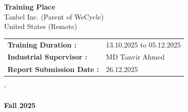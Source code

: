 \begin{titlepage}
\begin{center}
\vspace{0.8cm}

\textbf{Training Place}\\
Tanbel Inc. (Parent of WeCycle)\\
United States (Remote)

\vspace{0.8cm}

\begin{tabular}{@{}ll}
\hspace{1.8cm}\textbf{Training Duration    :} & 13.10.2025 to 05.12.2025 \\
\hspace{1.8cm}\textbf{Industrial Supervisor      :} & MD Tanvir Ahmed \\
\hspace{1.8cm}\textbf{Report Submission Date          :} & 26.12.2025 \\
\end{tabular}'

\vspace{0.7cm}
{\Large \textbf{Fall 2025}}


\end{center}
\end{titlepage}
